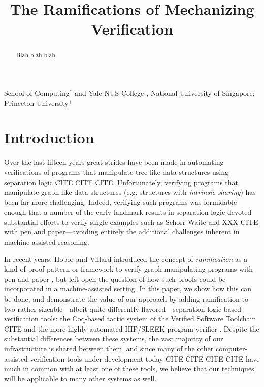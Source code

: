 \documentclass[pldi]{sigplanconf-pldi15}
\begin{document}
%
%

\title{The Ramifications of Mechanizing Verification}
{}
{School of Computing$^{*}$ and Yale-NUS College$^{\dagger}$, National University of Singapore; Princeton University$^{+}$}

\maketitle
\begin{abstract}
Blah blah blah
\end{abstract}

\newcommand\hide[1]{}

\section{Introduction}
Over the last fifteen years great strides have been made in automating verifications of programs that manipulate
tree-like data structures using separation logic CITE CITE CITE.  Unfortunately, verifying programs that manipulate
graph-like data structures (e.g. structures with \emph{intrinsic sharing}) has been far more challenging.
Indeed, verifying such programs was formidable enough that a number of the early landmark results in separation logic
devoted substantial efforts to verify single examples such as Schorr-Waite \cite{hongseok:phd} and XXX CITE with pen and
paper---avoiding entirely the additional challenges inherent in machine-assisted reasoning.

In recent years, Hobor and Villard introduced the concept of \emph{ramification} as a kind of proof pattern or framework
to verify graph-manipulating programs with pen and paper \cite{hobor:ramification}, but left open the question of how such proofs could
be incorporated in a machine-assisted setting.  In this paper, we show how this can be done, and demonstrate the
value of our approach by adding ramification to two rather sizeable---albeit quite differently flavored---separation logic-based
verification tools: the Coq-based tactic system of the Verified Software Toolchain CITE and the more highly-automated HIP/SLEEK
program verifier \cite{chin:hipsleek}.  Despite the substantial differences between these systems, the vast majority of our infrastructure is
shared between them, and since many of the other computer-assisted verification tools under development
today CITE CITE CITE CITE have much in common with at least one of these tools, we believe that our techniques will be
applicable to many other systems as well.
\end{document}

